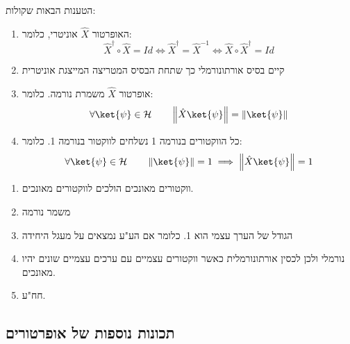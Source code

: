 \documentclass{tstextbook}
\begin{document}
\begin{proposition}
הטענות הבאות שקולות:

  \begin{enumerate}
    \item האופרטור \(\hat{X}\) אוניטרי, כלומר: 
$$\hat{X}^{\dagger} \circ \hat{X} = Id \iff \hat{X}^{\dagger} =\hat{X}^{-1} \iff \hat{X}\circ \hat{X}^{\dagger} = Id$$


    \item קיים בסיס אורתונורמלי כך שתחת הבסיס המטריצה המייצגת אוניטרית 


    \item אופרטור \(\hat{X}\) משמרת נורמה. כלומר: 
$$\forall \ket{\psi}  \in \mathcal{H}\qquad \left\lVert  \hat{X}\ket{\psi}  \right\rVert =\left\lVert  \ket{\psi}   \right\rVert  $$


    \item כל הווקטורים בנורמה 1 נשלחים לווקטור בנורמה 1. כלומר: 
$$\forall \ket{\psi}  \in \mathcal{H}\qquad \left\lVert  \ket{\psi}   \right\rVert =1\implies \left\lVert  \hat{X}\ket{\psi}   \right\rVert =1  $$


  \end{enumerate}
\end{proposition}
\begin{proposition}
  \begin{enumerate}
    \item ווקטורים מאונכים הולכים לווקטורים מאונכים. 


    \item משמר נורמה 


    \item הגודל של הערך עצמי הוא 1. כלומר אם הע"ע נמצאים על מעגל היחידה 


    \item נורמלי ולכן לכסין אורתונורמלית כאשר ווקטורים עצמיים עם ערכים עצמיים שונים יהיו מאונכים. 


    \item חח"ע. 


  \end{enumerate}
\end{proposition}
\subsection{תכונות נוספות של אופרטורים}
\end{document}
